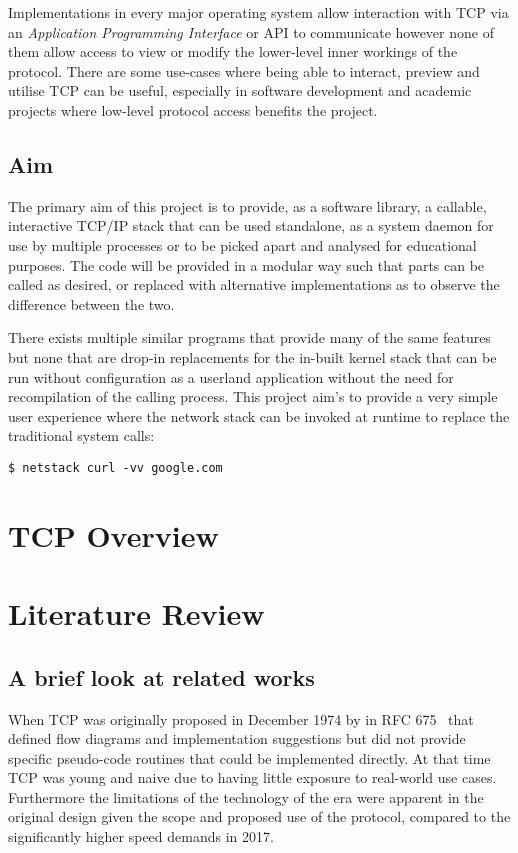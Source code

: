 \documentclass[11pt,a4paper,british]{bhamarticle}
\begin{document}
Implementations in every major operating system allow interaction with TCP via an \textit{Application Programming Interface} or API to communicate however none of them allow access to view or modify the lower-level inner workings of the protocol. There are some use-cases where being able to interact, preview and utilise TCP can be useful, especially in software development and academic projects where low-level protocol access benefits the project.

\subsection{Aim}
The primary aim of this project is to provide, as a software library, a callable, interactive TCP/IP stack that can be used standalone, as a system daemon for use by multiple processes or to be picked apart and analysed for educational purposes. The code will be provided in a modular way such that parts can be called as desired, or replaced with alternative implementations as to observe the difference between the two.

There exists multiple similar programs that provide many of the same features but none that are drop-in replacements for the in-built kernel stack that can be run without configuration as a userland application without the need for recompilation of the calling process. This project aim's to provide a very simple user experience where the network stack can be invoked at runtime to replace the traditional system calls:

\begin{center}
\texttt{\$ netstack curl -vv google.com}
\end{center}

\section{TCP Overview}

\section{Literature Review}
\subsection{A brief look at related works}
When TCP was originally proposed in December 1974 by \citeauthor{rfc675} in RFC 675~\cite{rfc675} that defined flow diagrams and implementation suggestions but did not provide specific pseudo-code routines that could be implemented directly. At that time TCP was young and naive due to having little exposure to real-world use cases. Furthermore the limitations of the technology of the era were apparent in the original design given the scope and proposed use of the protocol, compared to the significantly higher speed demands in 2017.
\end{document}
